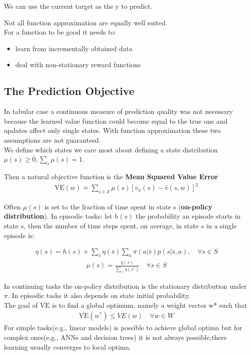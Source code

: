 We can use the current target as the y to predict.

Not all function approximation are equally well suited.\\

For a function to be good it needs to:
\begin{itemize}
    \item learn from incrementally obtained data
    \item deal with non-stationary reward functions
\end{itemize}
\subsection{The Prediction Objective}
In tabular case a continuous measure of prediction quality was not necessary because the learned value function could become equal to the true one and updates affect only single states.
With function approximation these two assumptions are not guaranteed.\\

We define which states we care most about defining a state distribution $\mu(s)\ge0,\sum_s\mu(s)=1$.

Then a natural objective function is the \textbf{Mean Squared Value Error}
\begin{align}
    \overline{\mbox{VE}}(w)\doteq\sum_{s\in\mathcal{S}}\mu(s)[v_\pi(s)-\hat{v}(s, w)]^2
\end{align}

Often $\mu(s)$ is set to the fraction of time spent in state s (\textbf{on-policy
distribution}).
In episodic tasks: let $h(s)$ the probability an episode starts in state $s$,
then the number of time steps spent, on average, in state $s$ in a
single episode is:

\begin{align}
    \eta(s)=h(s)+\sum_{\bar{s}}\eta(\bar{s})\sum_a\pi(a | \bar{s})p(s | \bar{s},a),\quad\forall s\in S
\end{align}
\begin{align}
    \mu(s)=\frac{\eta(s)}{\sum_{s'}\eta(s')}\quad\forall s\in S
\end{align}

In continuing tasks the on-policy distribution is the stationary
distribution under $\pi$. In episodic tasks it also depends on state initial
probability.\\


The goal of $\overline{\mbox{VE}}$ is to find a global optimum, namely a weight vector w* such that
\begin{align}
    \overline{\mbox{VE}}(w^*)\leq VE(w)\quad \forall w\in W
\end{align}
For simple tasks(e.g., linear
models) is possible to achieve global optima but for complex ones(e.g., ANNs and decision trees) it is not always possible,there learning usually converges to local optima.
